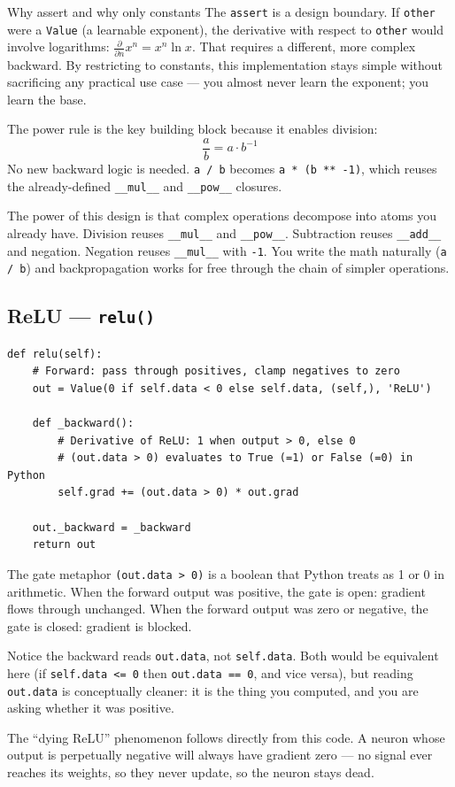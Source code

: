 \documentclass[12pt,a4paper]{article}
\newcommand{\code}[1]{\texttt{\small\color{deepblue}#1}}
\begin{document}
\begin{codeexplainbox}{Why assert and why only constants}
The \code{assert} is a design boundary. If \code{other} were a \code{Value} (a learnable exponent), the derivative with respect to \code{other} would involve logarithms: $\frac{\partial}{\partial n} x^n = x^n \ln x$. That requires a different, more complex backward. By restricting to constants, this implementation stays simple without sacrificing any practical use case — you almost never learn the exponent; you learn the base.

The power rule is the key building block because it enables division:
\[
\frac{a}{b} = a \cdot b^{-1}
\]
No new backward logic is needed. \code{a / b} becomes \code{a * (b ** -1)}, which reuses the already-defined \code{\_\_mul\_\_} and \code{\_\_pow\_\_} closures.
\end{codeexplainbox}

\begin{stickybox}
The power of this design is that complex operations decompose into atoms you already have. Division reuses \code{\_\_mul\_\_} and \code{\_\_pow\_\_}. Subtraction reuses \code{\_\_add\_\_} and negation. Negation reuses \code{\_\_mul\_\_} with \code{-1}. You write the math naturally (\code{a / b}) and backpropagation works for free through the chain of simpler operations.
\end{stickybox}

\subsection{ReLU — \texttt{relu()}}

\begin{lstlisting}
def relu(self):
    # Forward: pass through positives, clamp negatives to zero
    out = Value(0 if self.data < 0 else self.data, (self,), 'ReLU')

    def _backward():
        # Derivative of ReLU: 1 when output > 0, else 0
        # (out.data > 0) evaluates to True (=1) or False (=0) in Python
        self.grad += (out.data > 0) * out.grad

    out._backward = _backward
    return out
\end{lstlisting}

\begin{codeexplainbox}{The gate metaphor}
\code{(out.data > 0)} is a boolean that Python treats as 1 or 0 in arithmetic. When the forward output was positive, the gate is open: gradient flows through unchanged. When the forward output was zero or negative, the gate is closed: gradient is blocked.

Notice the backward reads \code{out.data}, not \code{self.data}. Both would be equivalent here (if \code{self.data <= 0} then \code{out.data == 0}, and vice versa), but reading \code{out.data} is conceptually cleaner: it is the thing you computed, and you are asking whether it was positive.

The ``dying ReLU'' phenomenon follows directly from this code. A neuron whose output is perpetually negative will always have gradient zero — no signal ever reaches its weights, so they never update, so the neuron stays dead.
\end{codeexplainbox}
\end{document}
